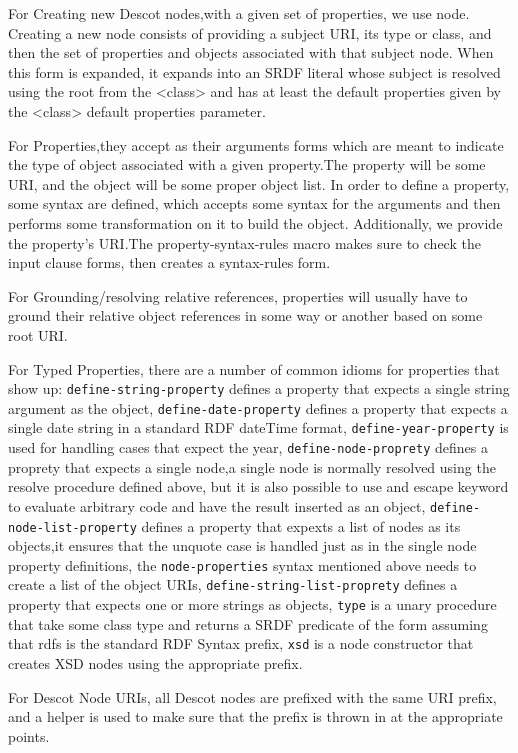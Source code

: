 For Creating new Descot nodes,with a given set of properties, we use node.
Creating a new node consists of providing a subject URI, its type or class, 
and then the set of properties and objects associated with that subject node.
When this form is expanded, it expands into an SRDF literal whose subject 
is resolved using the root from the <class> and has at least the default 
properties given by the <class> default properties parameter.

For Properties,they accept as their arguments forms which are meant to 
indicate the type of object associated with a given property.The property 
will be some URI, and the object will be some proper object list. In order 
to define a property, some syntax are defined, which accepts some 
syntax for the arguments and then performs some transformation on it to 
build the object. Additionally, we provide the property's URI.The 
property-syntax-rules macro makes sure to check the input clause forms,
then creates a syntax-rules form.

For Grounding/resolving relative references, properties will usually 
have to ground their relative object references in some way or another
based on some root URI.

For Typed Properties, there are a number of common idioms for properties 
that show up: {\tt define-string-property} defines a property that expects a 
single string argument as the object, {\tt define-date-property} defines a 
property that expects a single date string in a standard RDF dateTime
format, {\tt define-year-property} is used for handling cases that expect 
the year, {\tt define-node-proprety} defines a proprety that expects a single 
node,a single node is normally resolved using the resolve procedure 
defined above, but it is also possible to use and escape keyword to
evaluate arbitrary code and have the result inserted as an object, 
{\tt define-node-list-property} defines a property that expexts a list of 
nodes as its objects,it ensures that the unquote case is handled just 
as in the single node property definitions, the {\tt node-properties} syntax 
mentioned above needs to create a list of the object URIs, 
{\tt define-string-list-proprety} defines a property that expects one or more 
strings as objects, {\tt type} is a unary procedure that take some class type 
and returns a SRDF predicate of the form assuming that rdfs is the 
standard RDF Syntax prefix, {\tt xsd} is a node constructor that creates XSD 
nodes using the appropriate prefix.

For Descot Node URIs, all Descot nodes are prefixed with the same URI 
prefix, and a helper is used to make sure that the prefix is thrown in 
at the appropriate points.

